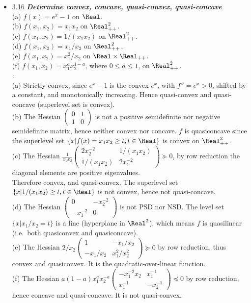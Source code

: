 \begin{itemize}
\item 3.16 {\bf\emph{Determine convex, concave, quasi-convex, quasi-concave}} \\ (a) $f(x)=e^x-1$ on
$\Real$. \\ (b) $f(x_1,x_2)= x_1x_2$ on $\Real^2_{++}$. \\ (c) $f(x_1,x_2)= 1/(x_1x_2)$ on
$\Real^2_{++}$. \\ (d) $f(x_1,x_2)= x_1/x_2$ on $\Real^2_{++}$. \\ (e) $f(x_1,x_2)= x_1^2/x_2$ on
$\Real \times \Real_{++}$. \\ (f) $f(x_1,x_2)= x_1^a x_2^{1-a}$, where $0\le a\le 1$, on
$\Real^2_{++}$. \\ \Proof: \\ (a) Strictly convex, since $e^x-1$ is the convex $e^x$, with
$f''=e^x>0$, shifted by a constant, and monotonically increasing.  Hence quasi-convex and
quasi-concave (superlevel set is convex).  \\ (b) The Hessian $\begin{pmatrix} 0 & 1 \\ 1 & 0
\end{pmatrix}$ is not a positive semidefinite nor negative semidefinite matrix, hence neither convex
nor concave.  $f$ is quasiconcave since the superlevel set $\{x| f(x)=x_1x_2\ge t, t\in \Real \}$ is
convex on $\Real^2_{++}$. \\ (c) The Hessian $\frac{1}{x_1x_2} \begin{pmatrix} 2x_2^{-2} &
1/(x_1x_2) \\ 1/(x_1x_2) & 2x_1^{-2} \end{pmatrix} \succeq 0$, by row reduction the diagonal
elements are positive eigenvalues. \\  Therefore convex, and quasi-convex. The superlevel set $\{x|
1/(x_1x_2) \ge t, t \in \Real \}$ is not convex, hence not quasi-concave. \\ (d) The Hessian
$\begin{pmatrix} 0 & -x_2^{-2} \\ -x_1^{-2} & 0 \end{pmatrix}$ is not PSD nor NSD\@.  The level set
$\{x| x_1/x_2 = t \}$ is a line (hyperplane in $\Real^2$), which means $f$ is quasilinear (i.e.\, both
quasiconvex and quasiconcave). \\ (e) The Hessian $2/x_2\begin{pmatrix} 1 & -x_1/x_2 \\ -x_1/x_2 &
x_1^2/x_2^2 \end{pmatrix} \succeq 0$ by row reduction, thus convex and quasiconvex.  It is the
quadratic-over-linear function. \\ (f) The Hessian $a(1-a)x_1^{a}x_2^{-a} \begin{pmatrix} -x_1^{-2}x_2
& x_1^{-1} \\ x_1^{-1} & -x_2^{-1} \end{pmatrix} \preceq 0$ by row reduction, hence concave and
quasi-concave.  It is not quasi-convex. \\


\end{itemize}
